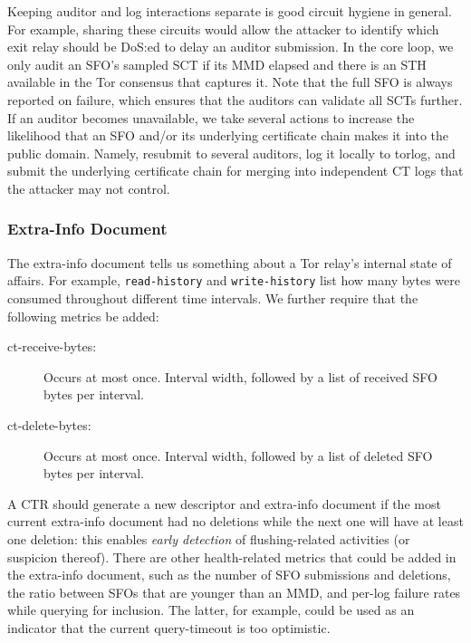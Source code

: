 Keeping auditor and log interactions separate is good circuit hygiene in
general.  For example,  sharing these circuits would allow the attacker to
identify which exit relay should be DoS:ed to delay an auditor submission.
In the core loop, we only audit an SFO's sampled SCT if its MMD elapsed
and there is an STH available in the Tor consensus that captures it.  Note that
the full SFO is always reported on failure, which ensures that the auditors can
validate all SCTs further.  If an auditor becomes unavailable, we take several
actions to increase the likelihood that an SFO and/or its underlying certificate
chain makes it into the public domain.  Namely, resubmit to several auditors,
log it locally to torlog, and submit the underlying certificate chain for
merging into independent CT logs that the attacker may not control.

%
%

\subsubsection{Extra-Info Document}
The extra-info document tells us something about a Tor relay's internal state of
affairs.  For example, \texttt{read-history} and \texttt{write-history} list how
many bytes were consumed throughout different time intervals.  We further
require that the following metrics be added:
\begin{description}
	\item[ct-receive-bytes:] Occurs at most once.  Interval width, followed by a
		list of received SFO bytes per interval.
	\item[ct-delete-bytes:] Occurs at most once.  Interval width, followed by a
		list of deleted SFO bytes per interval.
\end{description}

A CTR should generate a new descriptor and extra-info document if the most
current extra-info document had no deletions while the next one will have at
least one deletion:
	this enables \emph{early detection} of flushing-related activities
	(or suspicion thereof).
There are other health-related metrics that could be added in the
extra-info document, such as
	the number of SFO submissions and deletions,
	the ratio between SFOs that are younger than an MMD, and
	per-log failure rates while querying for inclusion.
The latter, for example, could be used as an indicator that the current
query-timeout is too optimistic.

